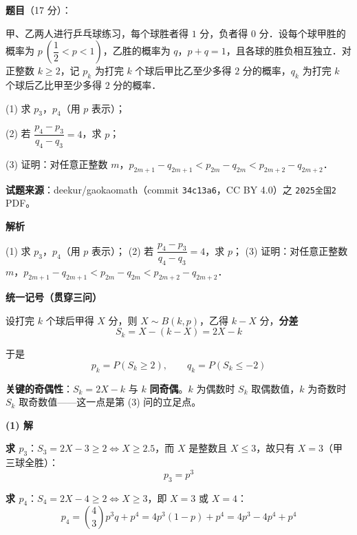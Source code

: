 \begin{answer}

\textbf{题目}（17 分）：

甲、乙两人进行乒乓球练习，每个球胜者得 $1$ 分，负者得 $0$ 分．设每个球甲胜的概率为 $p\ \left(\dfrac12<p<1\right)$，乙胜的概率为 $q$，$p+q=1$，且各球的胜负相互独立．对正整数 $k\ge 2$，记 $p_k$ 为打完 $k$ 个球后甲比乙至少多得 $2$ 分的概率，$q_k$ 为打完 $k$ 个球后乙比甲至少多得 $2$ 分的概率．

  (1) 求 $p_3$，$p_4$（用 $p$ 表示）；

  (2) 若 $\dfrac{p_4-p_3}{q_4-q_3}=4$，求 $p$；

  (3) 证明：对任意正整数 $m$，$p_{2m+1}-q_{2m+1}<p_{2m}-q_{2m}<p_{2m+2}-q_{2m+2}$．

\par\medskip

\begin{gktip}
\textbf{试题来源}：deekur/gaokaomath（commit \texttt{34c13a6}，CC BY 4.0）之 \texttt{2025全国2} PDF。
\end{gktip}

\textbf{解析}

  (1) 求 $p_3$，$p_4$（用 $p$ 表示）；
  (2) 若 $\dfrac{p_4-p_3}{q_4-q_3}=4$，求 $p$；
  (3) 证明：对任意正整数 $m$，$p_{2m+1}-q_{2m+1}<p_{2m}-q_{2m}<p_{2m+2}-q_{2m+2}$．

\par\medskip

\textbf{统一记号（贯穿三问）}

设打完 $k$ 个球后甲得 $X$ 分，则 $X\sim B(k,p)$，乙得 $k-X$ 分，\textbf{分差}
\nopagebreak[4]
\[S_k=X-(k-X)=2X-k\]

于是
\nopagebreak[4]
\[p_k=P\left(S_k\ge2\right),\qquad q_k=P\left(S_k\le-2\right)\]

\textbf{关键的奇偶性}：$S_k=2X-k$ 与 $k$ \textbf{同奇偶}。$k$ 为偶数时 $S_k$ 取偶数值，$k$ 为奇数时 $S_k$ 取奇数值——这一点是第 (3) 问的立足点。

\par\medskip

\textbf{(1) 解}

\textbf{求 $p_3$}：$S_3=2X-3\ge2\iff X\ge2.5$，而 $X$ 是整数且 $X\le3$，故只有 $X=3$（甲三球全胜）：
\nopagebreak[4]
\[p_3=p^3\]

\textbf{求 $p_4$}：$S_4=2X-4\ge2\iff X\ge3$，即 $X=3$ 或 $X=4$：
\nopagebreak[4]
\[p_4=\binom43p^3q+p^4=4p^3(1-p)+p^4=4p^3-4p^4+p^4\]


\end{answer}
